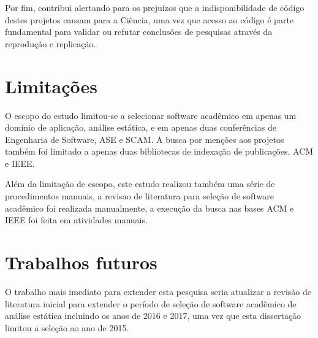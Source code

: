 
Por fim, contribui alertando para os prejuízos que a indisponibilidade de
código destes projetos causam para a Ciência, uma vez que acesso ao código é
parte fundamental para validar ou refutar conclusões de pesquisas através da
reprodução e replicação.



\section{Limitações}


O escopo do estudo limitou-se a selecionar software acadêmico em apenas um
domínio de aplicação, análise estática, e em apenas duas conferências de
Engenharia de Software, ASE e SCAM. A busca por menções aos projetos também foi
limitado a apenas duas bibliotecas de indexação de publicações, ACM e IEEE.


Além da limitação de escopo, este estudo realizou também uma série de
procedimentos manuais, a revisao de literatura para seleção de software
acadêmico foi realizada manualmente, a execução da busca nas bases ACM e IEEE
foi feita em atividades manuais.


\section{Trabalhos futuros}


O trabalho mais imediato para extender esta pesquisa seria atualizar a revisão
de literatura inicial para extender o período de seleção de software acadêmico
de análise estática incluindo os anos de 2016 e 2017, uma vez que esta
dissertação limitou a seleção ao ano de 2015.

